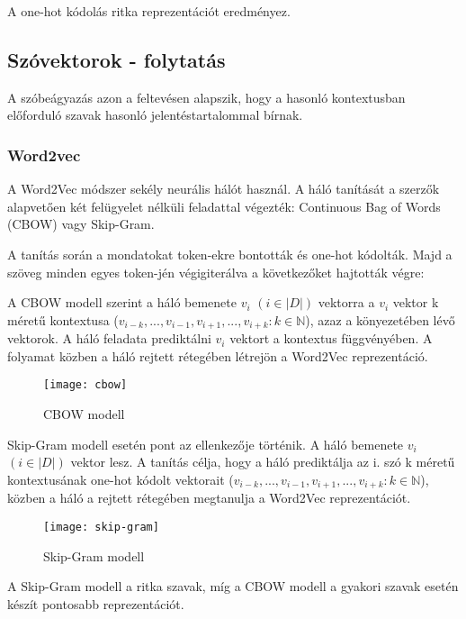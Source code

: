 \begin{note}
	A one-hot kódolás ritka reprezentációt eredményez.
\end{note}

\subsection*{Szóvektorok - folytatás}
A szóbeágyazás azon a feltevésen alapszik, hogy a hasonló kontextusban előforduló szavak hasonló jelentéstartalommal bírnak.

\subsubsection{Word2vec}
A Word2Vec módszer sekély neurális hálót használ. A háló tanítását a szerzők alapvetően két felügyelet nélküli feladattal végezték: Continuous Bag of Words (CBOW) vagy Skip-Gram.

A tanítás során a mondatokat token-ekre bontották és one-hot kódolták. Majd a szöveg minden egyes token-jén végigiterálva a következőket hajtották végre:

A CBOW modell szerint a háló bemenete $v_i$
$\left( i \in \left|D\right| \right)$ vektorra a $v_i$ vektor k méretű kontextusa ($v_{i-k},...,v_{i-1}, v_{i+1},..., v_{i+k} : k \in \mathbb{N}$), azaz a könyezetében lévő vektorok. A háló feladata prediktálni $v_i$ vektort a kontextus függvényében. A folyamat közben a háló rejtett rétegében létrejön a Word2Vec reprezentáció.

\begin{figure}[H]
	\centering
	\texttt{[image: cbow]}
	\caption{CBOW modell}
\end{figure}

Skip-Gram modell esetén pont az ellenkezője történik. A háló bemenete $v_i$
$\left( i \in \left|D\right| \right)$ vektor lesz. A tanítás célja, hogy a háló prediktálja az i. szó k méretű kontextusának one-hot kódolt vektorait ($v_{i-k},...,v_{i-1}, v_{i+1},..., v_{i+k} : k \in \mathbb{N}$), közben a háló a rejtett rétegében megtanulja a Word2Vec reprezentációt.

\begin{figure}[H]
	\centering
	\texttt{[image: skip-gram]}
	\caption{Skip-Gram modell}
\end{figure}

\begin{note}
	A Skip-Gram modell a ritka szavak, míg a CBOW modell a gyakori szavak esetén készít pontosabb reprezentációt.
\end{note}


